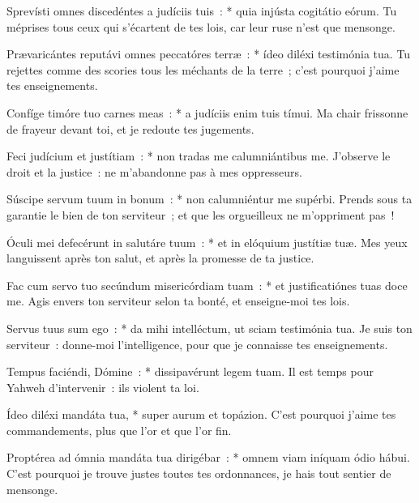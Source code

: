 \begin{paracol}{2}
\LigneParacol
{Sprevísti omnes discedéntes a judíciis tuis~: * quia injústa cogitátio eórum.}
{Tu méprises tous ceux qui s'écartent de tes lois, car leur ruse n'est que mensonge.}

\LigneParacol
{Prævaricántes reputávi omnes peccatóres terræ~: * ídeo diléxi testimónia tua.}
{Tu rejettes comme des scories tous les méchants de la terre~; c'est pourquoi j'aime tes enseignements.}

\LigneParacol
{Confíge timóre tuo carnes meas~: * a judíciis enim tuis tímui.}
{Ma chair frissonne de frayeur devant toi, et je redoute tes jugements. }

\LigneParacol
{Feci judícium et justítiam~: * non tradas me calumniántibus me.}
{J'observe le droit et la justice~: ne m'abandonne pas à mes oppresseurs.}

\LigneParacol
{Súscipe servum tuum in bonum~: * non calumniéntur me supérbi.}
{Prends sous ta garantie le bien de ton serviteur~; et que les orgueilleux ne m'oppriment pas~!}

\LigneParacol
{Óculi mei defecérunt in salutáre tuum~: * et in elóquium justítiæ tuæ.}
{Mes yeux languissent après ton salut, et après la promesse de ta justice.}

\LigneParacol
{Fac cum servo tuo secúndum misericórdiam tuam~: * et justificatiónes tuas doce me.}
{Agis envers ton serviteur selon ta bonté, et enseigne-moi tes lois.}

\LigneParacol
{Servus tuus sum ego~: * da mihi intelléctum, ut sciam testimónia tua.}
{Je suis ton serviteur~: donne-moi l'intelligence, pour que je connaisse tes enseignements.}

\LigneParacol
{Tempus faciéndi, Dómine~: * dissipavérunt legem tuam.}
{Il est temps pour Yahweh d'intervenir~: ils violent ta loi.}

\LigneParacol
{Ídeo diléxi mandáta tua, * super aurum et topázion.}
{C'est pourquoi j'aime tes commandements, plus que l'or et que l'or fin.}

\LigneParacol
{Proptérea ad ómnia mandáta tua dirigébar~: * omnem viam iníquam ódio hábui.}
{C'est pourquoi je trouve justes toutes tes ordonnances, je hais tout sentier de mensonge.  }

\end{paracol}
